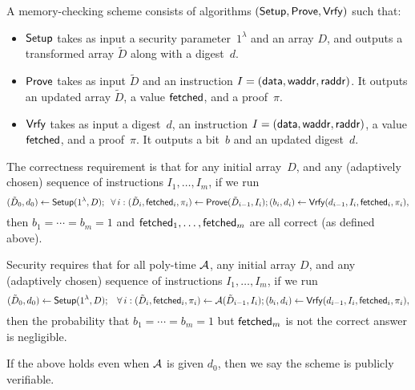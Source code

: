 \begin{definition}
A {\sf memory-checking scheme} consists of algorithms
$({\sf Setup}, {\sf Prove}, {\sf Vrfy})$ such that:
\begin{itemize}
\item ${\sf Setup}$ takes as input a security parameter~$1^\lambda$ and
an array $D$, and outputs a transformed array $\tilde D$ along with
a digest~$d$.
\item ${\sf Prove}$ takes as input $\tilde D$ and an instruction $I=(\mathsf{data}, \mathsf{waddr}, \mathsf{raddr})$.
It outputs an updated array $\tilde D$, a value ${\sf fetched}$, and a proof~$\pi$.
\item ${\sf Vrfy}$ takes as input a digest~$d$, an instruction $I=(\mathsf{data}, \mathsf{waddr}, \mathsf{raddr})$,
a value ${\sf fetched}$, and a proof~$\pi$. It outputs
a bit~$b$ and an updated digest~$d$.
\end{itemize}
The correctness requirement is that for any initial array~$D$,
and any (adaptively chosen) sequence of instructions $I_1, \ldots, I_m$, if we run
\[(\tilde D_0, d_0) \leftarrow {\sf Setup}(1^\lambda, D); \;\; \forall \, i:
(\tilde D_i, {\sf fetched}_i, \pi_i) \leftarrow {\sf Prove}(\tilde{D}_{i-1}, I_i);
(b_i, d_i) \leftarrow {\sf Vrfy}(d_{i-1}, I_i, {\sf fetched}_i, \pi_i),\]
then $b_1 = \cdots = b_m = 1$ and ${\sf fetched}_1, \ldots, {\sf fetched}_m$ are all
correct (as defined above).

Security requires that for all poly-time $\mathcal{A}$, any initial array $D$, and any
(adaptively chosen) sequence of instructions $I_1, \ldots, I_m$, if we run
\[(\tilde D_0, d_0) \leftarrow {\sf Setup}(1^\lambda, D); \;\;\; \forall \, i:
(\tilde D_i, {\sf fetched}_i, \pi_i) \leftarrow \mathcal{A}(\tilde{D}_{i-1}, I_i);
(b_i, d_i) \leftarrow {\sf Vrfy}(d_{i-1}, I_i, {\sf fetched}_i, \pi_i),\]
then the probability that $b_1 = \cdots = b_m = 1$ but ${\sf fetched}_m$ is not the correct answer
is negligible.

If the above holds even when $\mathcal{A}$ is given $d_0$, then we say the scheme is {\sf publicly verifiable}.
\end{definition}




